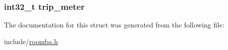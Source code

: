 \hypertarget{structroomba__data_a00d5dafaa40740d43325df48a57e3bad}{
\subsubsection[{trip\-\_\-meter}]{\setlength{\rightskip}{0pt plus 5cm}int32\-\_\-t {\bf trip\-\_\-meter}}}\label{structroomba__data_a00d5dafaa40740d43325df48a57e3bad}


\-The documentation for this struct was generated from the following file\-:\begin{DoxyCompactItemize}
\item 
include/\hyperlink{roomba_8h}{roomba.\-h}\end{DoxyCompactItemize}
